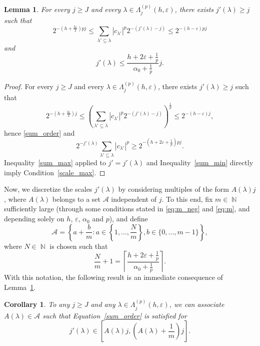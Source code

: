 \documentclass[a4paper,11pt,oneside]{article}
\DeclareMathOperator{\N}{\mathbb{N}}
\newcommand{\ccint}[1]{\left[{#1}\right]}
\newcommand{\modu}[1]{\left\vert{#1}\right\vert}
\theoremstyle{definition}
\theoremstyle{plain}
\newtheorem{lemma}[defi]{Lemma}
\newtheorem{cor}[defi]{Corollary}
\begin{document}
\begin{lemma}\label{lm:scale}
For every $j\geq J$ and every $\lambda\in\Lambda_j^{(p)}(h,\varepsilon)$, there exists $j'(\lambda)\geq j$ such that
\begin{equation}\label{sum_order}
2^{-\left(h+\frac{3\varepsilon}{2}\right)pj}\leq\sum_{\lambda'\subseteq\lambda}\modu{c_{\lambda'}}^p2^{-(j'(\lambda)-j)}\leq 2^{-(h-\varepsilon)pj}
\end{equation}
and
\begin{equation}\label{scale_max}
j'(\lambda)\leq \frac{h+2\varepsilon+\frac{1}{p}}{\alpha_0+\frac{1}{p}} j.
\end{equation}
\end{lemma}

\begin{proof}
For every $j\geq J$ and every $\lambda\in\Lambda_j^{(p)}(h,\varepsilon)$,
there exists $j'(\lambda)\geq j$ such that
\[
2^{-\left(h+\frac{3\varepsilon}{2}\right)j}\leq \left(\sum_{\lambda'\subseteq\lambda}\modu{c_{\lambda'}}^p2^{-(j'(\lambda)-j)}\right)^{\frac{1}{p}}\leq 2^{-(h-\varepsilon)j},
\]
hence \eqref{sum_order} and
\begin{equation}\label{sum_min}
2^{-j'(\lambda)}\sum_{\lambda'\subseteq\lambda}\modu{c_{\lambda'}}^p
\geq2^{-\left(h+2\varepsilon+\frac{1}{p}\right)pj}.
\end{equation}
Inequality~\eqref{sum_max} applied to $j'=j'(\lambda)$ and Inequality~\eqref{sum_min} directly imply
Condition~\eqref{scale_max}.
\end{proof}

Now, we discretize the scales $j'(\lambda)$ by considering multiples of the form $A(\lambda)j$, where $A(\lambda)$ belongs to a set $\mathcal{A}$ independent of $j$. To this end, fix $m\in\N$ sufficiently large (through some conditions stated in \eqref{eq:m_neg} and \eqref{eq:m}, and depending solely on $h$, $\varepsilon$, $\alpha_0$ and $p$), and define
\[
\mathcal{A}=\left\{a+\frac{b}{m}:a\in\left\{1,\ldots,\frac{N}{m}\right\}, b\in\{0,\ldots,m-1\}\right\},
\]
where $N\in\N$ is chosen such that  $$\frac{N}{m}+1=\left\lceil\frac{h+2\varepsilon+\frac{1}{p}}{\alpha_0+\frac{1}{p}}\right\rceil.$$
With this notation, the following result is an immediate consequence of Lemma~\ref{lm:scale}.

\begin{cor}\label{cor:scale}
To any $j\geq J$ and any $\lambda\in\Lambda_j^{(p)}(h,\varepsilon)$, we can associate $A(\lambda)\in\mathcal{A}$ such that Equation~\eqref{sum_order} is satisfied for 
\[
j'(\lambda)\in\ccint{A(\lambda)j,\left(A(\lambda)+\frac{1}{m}\right)j}.
\]
\end{cor}
\end{document}
